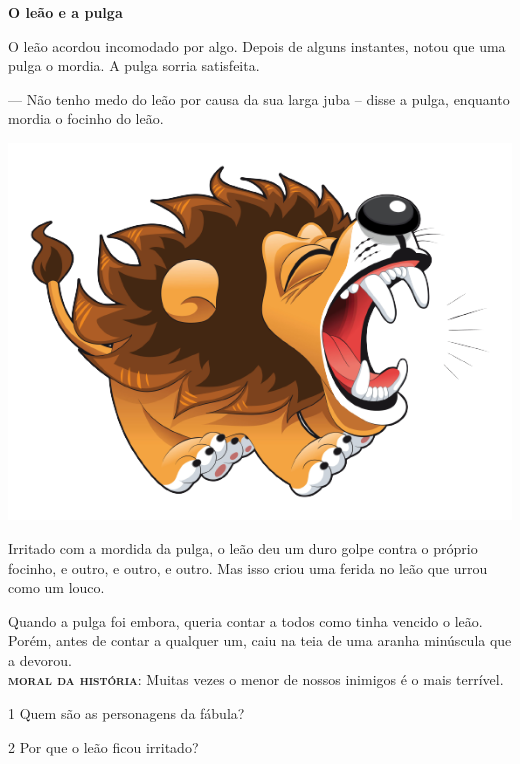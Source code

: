 \begin{myquote}
\textbf{O leão e a pulga}\bigskip

O leão acordou incomodado por algo. Depois de alguns instantes, notou que uma pulga o mordia. A pulga sorria satisfeita. 

--- Não tenho medo do leão por causa da sua larga juba -- disse a pulga, enquanto mordia o focinho do leão.  

\begin{center}
\noindent\includegraphics[width=.9\textwidth]{./media/image1b.png}
\end{center}

Irritado com a mordida da pulga, o leão deu um duro golpe contra o próprio focinho, e outro, e outro, e outro. Mas isso criou uma ferida no leão que urrou como um louco.

Quando a pulga foi embora, queria contar a todos como tinha vencido o leão. Porém, antes de contar a qualquer um, caiu na teia de uma aranha minúscula que a devorou. \\

\noindent\textsc{\textbf{moral da história}}: Muitas vezes o menor de nossos inimigos é o mais terrível.

\end{myquote}

\num{1} Quem são as personagens da fábula?


\num{2} Por que o leão ficou irritado?


